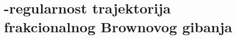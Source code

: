\documentclass[main.tex]{subfiles}
\begin{document}
\nocite{*}

\chapter{\holder -regularnost trajektorija frakcionalnog Brownovog gibanja}\label{chapter-gl}
\end{document}
